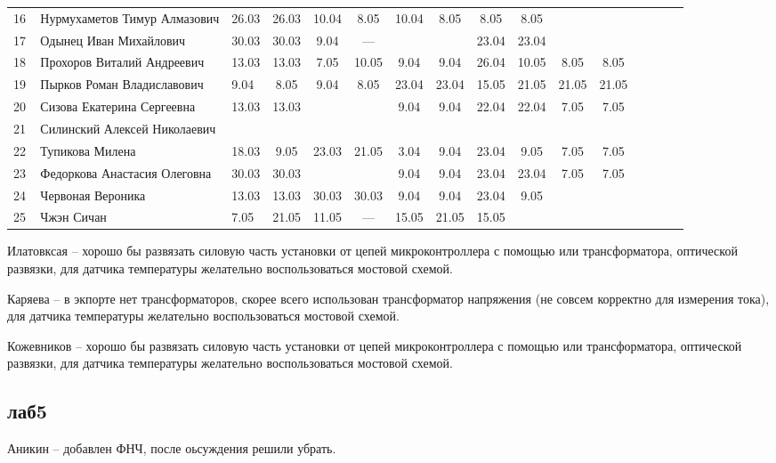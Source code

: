 \documentclass[a4paper,11pt]{article}
\begin{document}
\begin{tabular}{l|llccccccccccccc}
\midrule
16\,&Нурмухаметов Тимур Алмазович   &26.03&26.03 &10.04& 8.05&10.04& 8.05& 8.05& 8.05& &\\
17\,&Одынец Иван Михайлович         &30.03&30.03 & 9.04& --- &     &     &23.04&23.04\\
18\,&Прохоров Виталий Андреевич     &13.03&13.03 & 7.05&10.05& 9.04& 9.04&26.04&10.05& 8.05& 8.05\\
19\,&Пырков Роман Владиславович     & 9.04& 8.05 & 9.04& 8.05&23.04&23.04&15.05&21.05&21.05&21.05\\
20\,&Сизова Екатерина Сергеевна     &13.03&13.03 &     &     & 9.04& 9.04&22.04&22.04& 7.05& 7.05\\
\midrule
21\,&Силинский Алексей Николаевич   &     &      &     &     &     &     &     &\\
22\,&Тупикова Милена                &18.03& 9.05 &23.03&21.05& 3.04& 9.04&23.04& 9.05& 7.05& 7.05\\
23\,&Федоркова Анастасия Олеговна   &30.03&30.03 &     &     & 9.04& 9.04&23.04&23.04& 7.05&7.05\\
24\,&Червоная Вероника              &13.03&13.03 &30.03&30.03& 9.04& 9.04&23.04& 9.05&     &\\
25\,&Чжэн Сичан                     & 7.05&21.05 &11.05& --- &15.05&21.05&15.05&\\
\bottomrule
\end{tabular}

\newpage
{}
\recalctypearea
{}

Илатовксая -- хорошо бы развязать силовую часть установки от цепей микроконтроллера с помощью или трансформатора, оптической развязки, 
для датчика температуры желательно воспользоваться мостовой схемой.

Каряева -- в экпорте нет трансформаторов, скорее всего использован трансформатор напряжения (не совсем корректно для измерения тока), 
для датчика температуры желательно воспользоваться мостовой схемой.

Кожевников -- хорошо бы развязать силовую часть установки от цепей микроконтроллера с помощью или трансформатора, оптической развязки,
для датчика температуры желательно воспользоваться мостовой схемой.

\subsection*{лаб5}
Аникин -- добавлен ФНЧ, после оьсуждения решили убрать.
\end{document}
